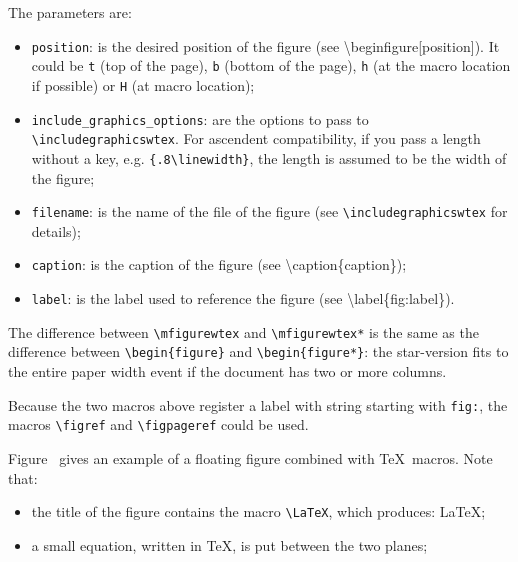 \documentclass[book]{upmethodology-document}
\begin{document}
The parameters are:
\begin{itemize}
\item \texttt{position}: is the desired position of the figure (see {\textbackslash}begin{figure}[position]). It could be \texttt{t} (top of the page), \texttt{b} (bottom of the page), \texttt{h} (at the macro location if possible) or \texttt{H} (at macro location);

\item \texttt{include\_graphics\_options}: are the options to pass to \texttt{{\textbackslash}includegraphicswtex}. For ascendent compatibility, if you pass a length without a key, e.g. \texttt{\{.8{\textbackslash}linewidth\}}, the length is assumed to be the width of the figure;

\item \texttt{filename}: is the name of the file of the figure (see \texttt{{\textbackslash}includegraphicswtex} for details);

\item \texttt{caption}: is the caption of the figure (see {\textbackslash}caption\{caption\});

\item \texttt{label}: is the label used to reference the figure (see {\textbackslash}label\{fig:label\}).
\end{itemize}

The difference between \texttt{{\textbackslash}mfigurewtex} and \texttt{{\textbackslash}mfigurewtex*} is the same as the difference between \texttt{{\textbackslash}begin\{figure\}} and \texttt{{\textbackslash}begin\{figure*\}}: the star-version fits to the entire paper width event if the document has two or more columns.

Because the two macros above register a label with string starting with \texttt{fig:}, the macros \texttt{{\textbackslash}figref} and \texttt{{\textbackslash}figpageref} could be used.


Figure~ gives an example of a floating figure combined with \TeX\ macros. Note that:
\begin{itemize}
\item the title of the figure contains the macro \texttt{{\textbackslash}LaTeX}, which produces: \LaTeX;
\item a small equation, written in \TeX, is put between the two planes;
\end{itemize}
\end{document}

